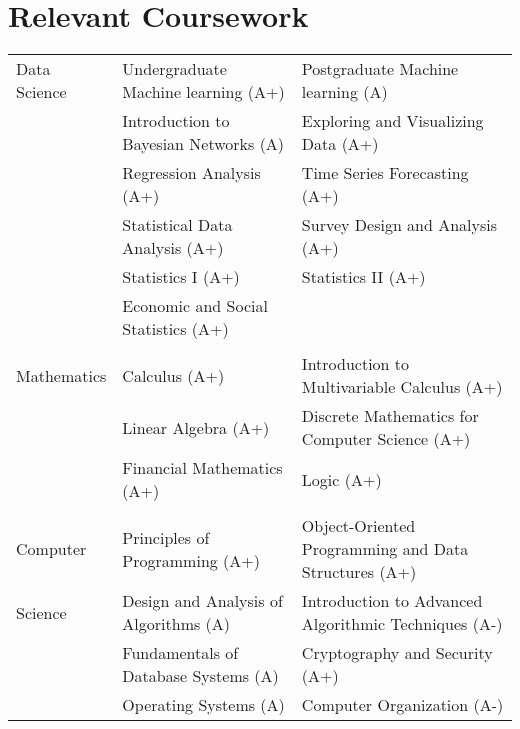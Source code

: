 \documentclass[10pt, oneside]{article}
\begin{document}
\section*{Relevant Coursework}
\begin{tabularx}{\linewidth}{p{2.2cm}|p{7cm} p{9cm}}
	\toprule 
	Data Science
	&
	Undergraduate Machine learning (A+) & Postgraduate Machine learning (A)\\
	&
	Introduction to Bayesian Networks (A) & Exploring and Visualizing Data (A+)\\
	&
	Regression Analysis (A+) & Time Series Forecasting (A+)\\
	&
	Statistical Data Analysis (A+) & Survey Design and Analysis (A+)\\	
	&
	Statistics I (A+) & Statistics II (A+) \\
	&
	Economic and Social Statistics (A+) 
	\\\\
	Mathematics &
	Calculus (A+) & Introduction to Multivariable Calculus (A+)\\
	& Linear Algebra (A+) & Discrete Mathematics for Computer Science (A+)\\
	& Financial Mathematics (A+) & Logic (A+) 
	\\\\
	Computer 
	&
	Principles of Programming (A+) & Object-Oriented Programming and Data Structures (A+)\\
	Science & Design and Analysis of Algorithms (A) & Introduction to Advanced Algorithmic Techniques (A-)\\
	& Fundamentals of Database Systems (A) & Cryptography and Security (A+)\\
	& Operating Systems (A) & Computer Organization (A-)\\
\end{tabularx}
\vspace{-0.3cm}
\end{document}
